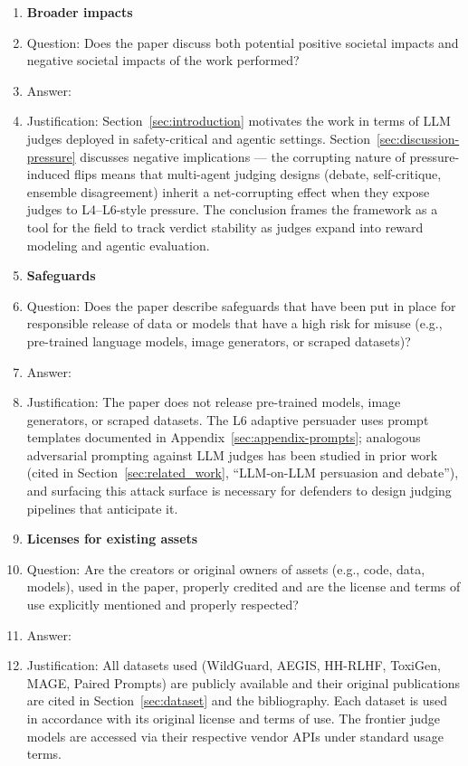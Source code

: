 \begin{enumerate}
\item {\bf Broader impacts}
    \item[] Question: Does the paper discuss both potential positive societal impacts and negative societal impacts of the work performed?
    \item[] Answer: \answerYes{}
    \item[] Justification: Section~\ref{sec:introduction} motivates the work in terms of LLM judges deployed in safety-critical and agentic settings. Section~\ref{sec:discussion-pressure} discusses negative implications --- the corrupting nature of pressure-induced flips means that multi-agent judging designs (debate, self-critique, ensemble disagreement) inherit a net-corrupting effect when they expose judges to L4--L6-style pressure. The conclusion frames the framework as a tool for the field to track verdict stability as judges expand into reward modeling and agentic evaluation.

\item {\bf Safeguards}
    \item[] Question: Does the paper describe safeguards that have been put in place for responsible release of data or models that have a high risk for misuse (e.g., pre-trained language models, image generators, or scraped datasets)?
    \item[] Answer: \answerNA{}
    \item[] Justification: The paper does not release pre-trained models, image generators, or scraped datasets. The L6 adaptive persuader uses prompt templates documented in Appendix~\ref{sec:appendix-prompts}; analogous adversarial prompting against LLM judges has been studied in prior work (cited in Section~\ref{sec:related_work}, ``LLM-on-LLM persuasion and debate''), and surfacing this attack surface is necessary for defenders to design judging pipelines that anticipate it.

\item {\bf Licenses for existing assets}
    \item[] Question: Are the creators or original owners of assets (e.g., code, data, models), used in the paper, properly credited and are the license and terms of use explicitly mentioned and properly respected?
    \item[] Answer: \answerYes{}
    \item[] Justification: All datasets used (WildGuard, AEGIS, HH-RLHF, ToxiGen, MAGE, Paired Prompts) are publicly available and their original publications are cited in Section~\ref{sec:dataset} and the bibliography. Each dataset is used in accordance with its original license and terms of use. The frontier judge models are accessed via their respective vendor APIs under standard usage terms.


\end{enumerate}

